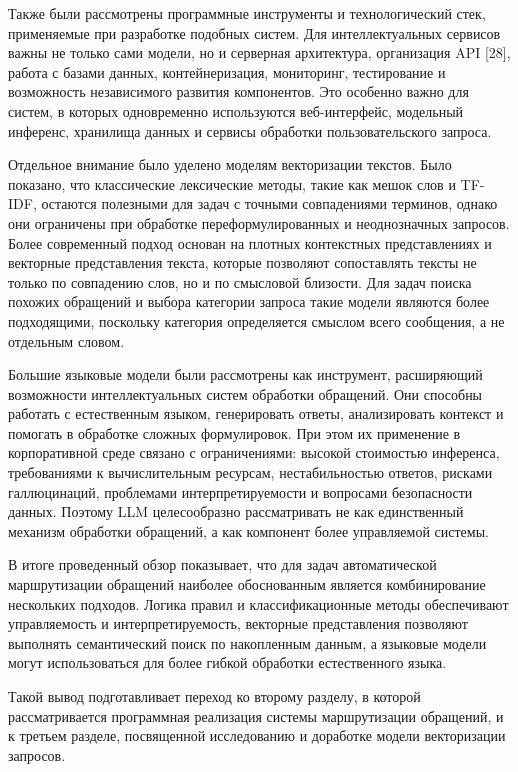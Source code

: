 \documentclass[14pt,a4paper]{extarticle}
\numberwithin{figure}{section}
\numberwithin{table}{section}
\begin{document}
Также были рассмотрены программные инструменты и технологический стек,
применяемые при разработке подобных систем. Для интеллектуальных
сервисов важны не только сами модели, но и серверная архитектура,
организация API [28], работа с базами данных, контейнеризация, мониторинг,
тестирование и возможность независимого развития компонентов. Это
особенно важно для систем, в которых одновременно используются
веб-интерфейс, модельный инференс, хранилища данных и сервисы обработки
пользовательского запроса.

Отдельное внимание было уделено моделям векторизации текстов. Было
показано, что классические лексические методы, такие как мешок слов и
TF-IDF, остаются полезными для задач с точными совпадениями терминов,
однако они ограничены при обработке переформулированных и неоднозначных
запросов. Более современный подход основан на плотных контекстных
представлениях и векторные представления текста, которые позволяют сопоставлять
тексты не только по совпадению слов, но и по смысловой близости. Для
задач поиска похожих обращений и выбора категории запроса такие модели
являются более подходящими, поскольку категория определяется смыслом
всего сообщения, а не отдельным словом.

Большие языковые модели были рассмотрены как инструмент, расширяющий
возможности интеллектуальных систем обработки обращений. Они способны
работать с естественным языком, генерировать ответы, анализировать
контекст и помогать в обработке сложных формулировок. При этом их
применение в корпоративной среде связано с ограничениями: высокой
стоимостью инференса, требованиями к вычислительным ресурсам,
нестабильностью ответов, рисками галлюцинаций, проблемами
интерпретируемости и вопросами безопасности данных. Поэтому LLM
целесообразно рассматривать не как единственный механизм обработки
обращений, а как компонент более управляемой системы.

В итоге проведенный обзор показывает, что для задач автоматической
маршрутизации обращений наиболее обоснованным является комбинирование
нескольких подходов. Логика правил и классификационные методы
обеспечивают управляемость и интерпретируемость, векторные представления
позволяют выполнять семантический поиск по накопленным данным, а
языковые модели могут использоваться для более гибкой обработки
естественного языка.

Такой вывод подготавливает переход ко второму разделу,
в которой рассматривается программная реализация системы маршрутизации
обращений, и к третьем разделе, посвященной исследованию и доработке
модели векторизации запросов.
\end{document}
